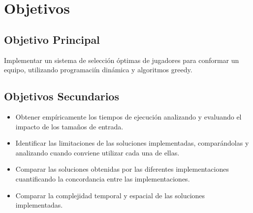\chapter{Objetivos}
\section{Objetivo Principal}
Implementar un sistema de selección óptimas de jugadores para conformar un equipo, utilizando programaciín dinámica y algoritmos greedy.
\section{Objetivos Secundarios}

\begin{itemize}
    \item Obtener empíricamente los tiempos de ejecución analizando y evaluando el impacto de los tamaños de entrada.
    \item Identificar las limitaciones de las soluciones implementadas, comparándolas y analizando cuando conviene utilizar cada una de ellas.
    \item Comparar las soluciones obtenidas por las diferentes implementaciones cuantificando la concordancia entre las implementaciones.
    \item Comparar la complejidad temporal y espacial de las soluciones implementadas.
\end{itemize}